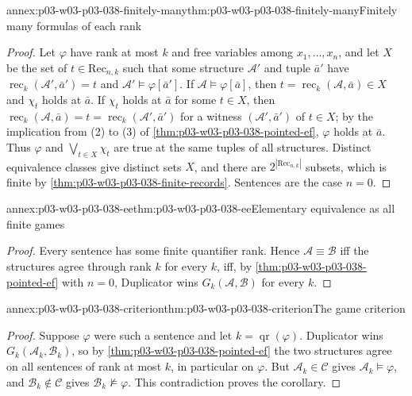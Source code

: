 \begin{annexitem}{annex:p03-w03-p03-038-finitely-many}{thm:p03-w03-p03-038-finitely-many}{Finitely many formulas of each rank}
\begin{proof}
Let \(\varphi\) have rank at most \(k\) and free variables among
\(x_1,\ldots,x_n\), and let \(X\) be the set of \(t\in\mathrm{Rec}_{n,k}\)
such that some structure \(\mathcal A'\) and tuple \(\bar a'\) have
\(\operatorname{rec}_k(\mathcal A',\bar a')=t\) and
\(\mathcal A'\models\varphi[\bar a']\). If \(\mathcal A\models\varphi[\bar a]\),
then \(t=\operatorname{rec}_k(\mathcal A,\bar a)\in X\) and \(\chi_t\) holds at
\(\bar a\). If \(\chi_t\) holds at \(\bar a\) for some \(t\in X\), then
\(\operatorname{rec}_k(\mathcal A,\bar a)=t=\operatorname{rec}_k(\mathcal A',\bar a')\)
for a witness \((\mathcal A',\bar a')\) of \(t\in X\); by the implication from (2)
to (3) of \cref{thm:p03-w03-p03-038-pointed-ef}, \(\varphi\) holds at
\(\bar a\). Thus \(\varphi\) and \(\bigvee_{t\in X}\chi_t\) are true at the same
tuples of all structures. Distinct equivalence classes give distinct sets
\(X\), and there are \(2^{|\mathrm{Rec}_{n,k}|}\) subsets, which is finite by
\cref{thm:p03-w03-p03-038-finite-records}. Sentences are the case \(n=0\).
\end{proof}
\end{annexitem}

\begin{annexitem}{annex:p03-w03-p03-038-ee}{thm:p03-w03-p03-038-ee}{Elementary equivalence as all finite games}
\begin{proof}
Every sentence has some finite quantifier rank. Hence
\(\mathcal A\equiv\mathcal B\) iff the structures agree through rank \(k\) for
every \(k\), iff, by \cref{thm:p03-w03-p03-038-pointed-ef} with \(n=0\),
Duplicator wins \(G_k(\mathcal A,\mathcal B)\) for every \(k\).
\end{proof}
\end{annexitem}

\begin{annexitem}{annex:p03-w03-p03-038-criterion}{thm:p03-w03-p03-038-criterion}{The game criterion}
\begin{proof}
Suppose \(\varphi\) were such a sentence and let \(k=\operatorname{qr}(\varphi)\).
Duplicator wins \(G_k(\mathcal A_k,\mathcal B_k)\), so by
\cref{thm:p03-w03-p03-038-pointed-ef} the two structures agree on all sentences
of rank at most \(k\), in particular on \(\varphi\). But
\(\mathcal A_k\in\mathcal C\) gives \(\mathcal A_k\models\varphi\), and
\(\mathcal B_k\notin\mathcal C\) gives \(\mathcal B_k\not\models\varphi\).
This contradiction proves the corollary.
\end{proof}
\end{annexitem}

